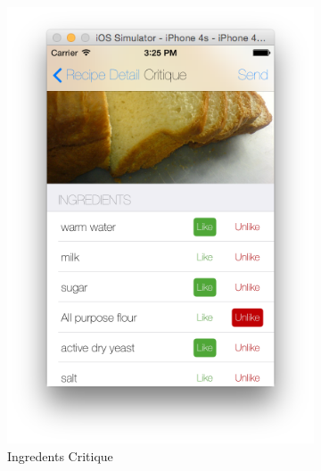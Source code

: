 \begin{figure}[h]
\begin{subfigure}{.32\textwidth}
	  		\includegraphics[width=.9\linewidth]{figures/ch4_app_screen_shots/critique/critique_2.png}
	  		\caption{Ingredents Critique}
	  	\end{subfigure}
	  	\begin{subfigure}{.32\textwidth}

\end{subfigure}
\end{figure}
